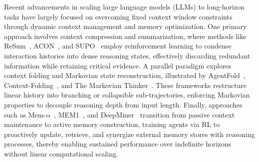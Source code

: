 Recent advancements in scaling large language models (LLMs) to long-horizon tasks have largely focused on overcoming fixed context window constraints through dynamic context management and memory optimization. One primary approach involves context compression and summarization, where methods like ReSum~\cite{wu2025resum}, ACON~\cite{kang2025acon}, and SUPO~\cite{lu2025scaling} employ reinforcement learning to condense interaction histories into dense reasoning states, effectively discarding redundant information while retaining critical evidence. A parallel paradigm explores context folding and Markovian state reconstruction, illustrated by AgentFold~\cite{ye2025agentfold}, Context-Folding~\cite{sun2025scaling}, and The Markovian Thinker~\cite{aghajohari2025markovian}. These frameworks restructure linear history into branching or collapsible sub-trajectories, enforcing Markovian properties to decouple reasoning depth from input length. Finally, approaches such as Mem-$\alpha$~\cite{wang2025mem}, MEM1~\cite{zhou2025mem1}, and DeepMiner~\cite{tang2025beyond} transition from passive context maintenance to active memory construction, training agents via RL to proactively update, retrieve, and synergize external memory stores with reasoning processes, thereby enabling sustained performance over indefinite horizons without linear computational scaling.